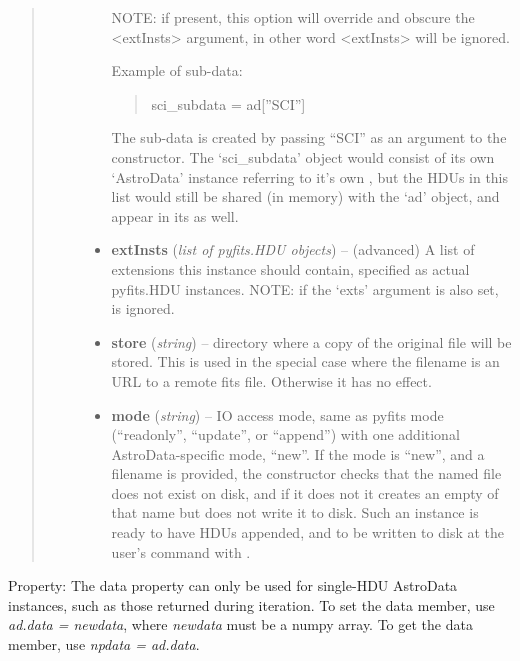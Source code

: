 \documentclass[letterpaper,10pt,english]{sphinxmanual}
\begin{document}
\begin{fulllineitems}
\begin{quote}
\begin{description}
\begin{itemize}
NOTE: if present, this option will override and obscure the 
\textless{}extInsts\textgreater{} argument, in other word \textless{}extInsts\textgreater{} will be ignored.

Example of sub-data:
\begin{quote}

sci\_subdata = ad{[}''SCI''{]}
\end{quote}

The sub-data is created by passing ``SCI'' as an argument to the
constructor. The `sci\_subdata' object would consist of its own 
`AstroData' instance referring to it's own , but the 
HDUs in this list would still be shared (in memory) with the `ad'
object, and appear in its  as well.


\item {} 
\textbf{extInsts} (\emph{list of pyfits.HDU objects}) -- (advanced) A list of extensions this instance should 
contain, specified as actual pyfits.HDU instances. NOTE: if the 
`exts' argument is also set,  is ignored.

\item {} 
\textbf{store} (\emph{string}) -- directory where a copy of the original file will be 
stored.  This is used in the special case where the
filename is an URL to a remote fits file.  Otherwise it has
no effect.

\item {} 
\textbf{mode} (\emph{string}) -- IO access mode, same as pyfits mode (``readonly'', ``update'',
or ``append'') with one additional AstroData-specific mode, ``new''.
If the mode is ``new'', and a filename is provided, the constructor
checks that the named file does not exist on disk,
and if it does not it creates an empty  of that name 
but does not write it to disk. Such an  
instance is ready to have HDUs appended, and to be written to disk
at the user's command with .

\end{itemize}

\end{description}\end{quote}

\begin{fulllineitems}
\label{astro_class:astrodata.AstroData.data}
Property: The data property can only be used for single-HDU AstroData
instances, such as those returned during iteration. To set the 
data member, use \emph{ad.data = newdata}, where \emph{newdata} must be a 
numpy array. To get the data member, use \emph{npdata = ad.data}.


\end{fulllineitems}
\end{fulllineitems}
\end{document}
